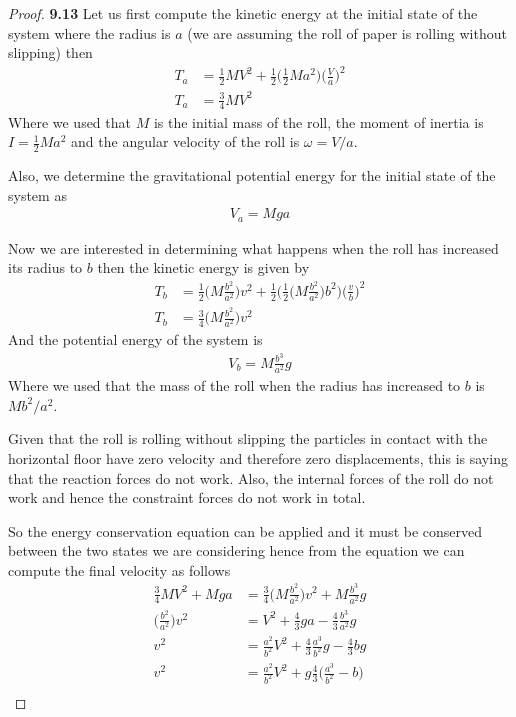 \documentclass[11pt]{article}
\theoremstyle{definition}
\begin{document}
    \begin{proof}{\textbf{9.13}}
        Let us first compute the kinetic energy at the initial state of the
        system where the radius is $a$ (we are assuming the roll of paper is
        rolling without slipping) then
        \begin{align*}
            T_a &= \frac{1}{2}MV^2
            + \frac{1}{2}\bigg(\frac{1}{2}Ma^2\bigg)\bigg( \frac{V}{a} \bigg)^2\\
            T_a &= \frac{3}{4}MV^2
        \end{align*}
        Where we used that $M$ is the initial mass of the roll,
        the moment of inertia is $I = \frac{1}{2}Ma^2$ and the angular velocity
        of the roll is $\omega = V/a$.

        Also, we determine the gravitational potential energy for the initial
        state of the system as
        \begin{align*}
            V_a = Mga
        \end{align*}

        Now we are interested in determining what happens when the roll has 
        increased its radius to $b$ then the kinetic energy is given by
        \begin{align*}
            T_b &= \frac{1}{2}\bigg(M\frac{b^2}{a^2}\bigg)v^2
            + \frac{1}{2}\bigg(\frac{1}{2}\bigg(M\frac{b^2}{a^2}\bigg)b^2\bigg)
            \bigg( \frac{v}{b} \bigg)^2\\
            T_b &= \frac{3}{4}\bigg(M\frac{b^2}{a^2}\bigg)v^2
        \end{align*}
        And the potential energy of the system is
        \begin{align*}
            V_b = M\frac{b^3}{a^2}g
        \end{align*}
        Where we used that the mass of the roll when the radius has increased
        to $b$ is $Mb^2/a^2$.
 
        Given that the roll is rolling without slipping the particles in
        contact with the horizontal floor have zero velocity and therefore
        zero displacements, this is saying that the reaction forces do not work.
        Also, the internal forces of the roll do not work and hence
        the constraint forces do not work in total.

        So the energy conservation equation can be applied and it must be
        conserved between the two states we are considering hence from
        the equation we can compute the final velocity as follows
        \begin{align*}
            \frac{3}{4}MV^2 + Mga
            &= \frac{3}{4}\bigg(M\frac{b^2}{a^2}\bigg)v^2 + M\frac{b^3}{a^2}g\\
            \bigg(\frac{b^2}{a^2}\bigg)v^2
            &= V^2 + \frac{4}{3}ga - \frac{4}{3}\frac{b^3}{a^2}g\\
            v^2 &= \frac{a^2}{b^2}V^2
            + \frac{4}{3}\frac{a^3}{b^2}g - \frac{4}{3}bg\\
            v^2 &= \frac{a^2}{b^2}V^2
            + g\frac{4}{3}\bigg(\frac{a^3}{b^2} - b\bigg)\\
        \end{align*}


\end{proof}
\end{document}
